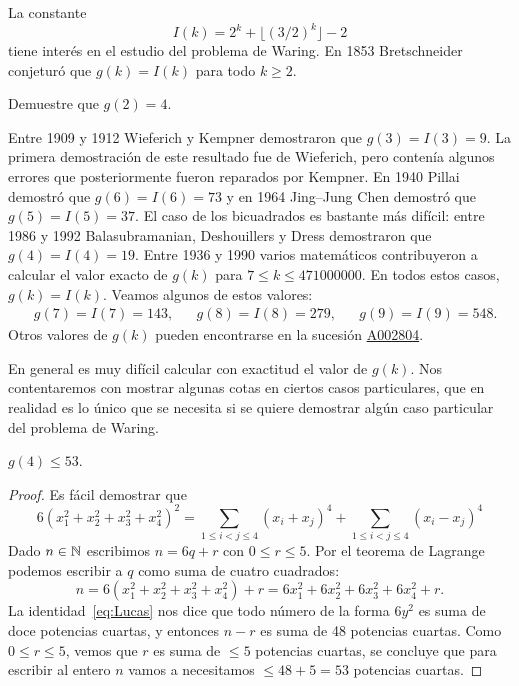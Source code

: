 La constante 
\[
	I(k)=2^k+\lfloor (3/2)^k\rfloor-2 
\]
tiene interés en el estudio del problema de Waring. En 1853 Bretschneider
conjeturó que $g(k)=I(k)$ para todo $k\geq2$.

\begin{exercise}
	Demuestre que $g(2)=4$. 
\end{exercise}

Entre 1909 y 1912 Wieferich y Kempner demostraron que $g(3)=I(3)=9$.  La
primera demostración de este resultado fue de Wieferich, pero contenía algunos
errores que posteriormente fueron reparados por Kempner.    
En 1940 Pillai
demostró que $g(6)=I(6)=73$ y en 1964 Jing--Jung Chen demostró que
$g(5)=I(5)=37$.  
El caso de los bicuadrados es bastante más difícil: entre 1986
y 1992 Balasubramanian, Deshouillers y Dress demostraron que $g(4)=I(4)=19$.
Entre 1936 y 1990 varios matemáticos contribuyeron a calcular el valor exacto
de $g(k)$ para $7\leq k\leq 471000000$. En todos estos casos, $g(k)=I(k)$.
Veamos algunos de estos valores:
\begin{align*}
	&g(7)=I(7)=143,
	&&g(8)=I(8)=279,
	&&g(9)=I(9)=548.
\end{align*}
Otros valores de $g(k)$ pueden encontrarse en la sucesión
\href{https://oeis.org/A002804}{A002804}.

En general es muy difícil calcular con exactitud el valor de $g(k)$. Nos
contentaremos con mostrar algunas cotas en ciertos casos particulares, que en
realidad es lo único que se necesita si se quiere demostrar algún caso
particular del problema de Waring.

\begin{theorem}[Liouville]
	$g(4)\leq 53$.
\end{theorem}

\begin{proof}
	Es fácil demostrar que
	\begin{equation}
		\label{eq:Lucas}
		6(x_1^2+x_2^2+x_3^2+x_4^2)^2=\sum_{1\leq i<j\leq 4}(x_i+x_j)^4+\sum_{1\leq i<j\leq 4}(x_i-x_j)^4
	\end{equation}
	Dado $n\in\mathbb{N}$ escribimos $n=6q+r$ con $0\leq r\leq 5$. Por el teorema de Lagrange podemos
	escribir a $q$ como suma de cuatro cuadrados:
	\[
		n=6(x_1^2+x_2^2+x_3^2+x_4^2)+r=6x_1^2+6x_2^2+6x_3^2+6x_4^2+r.
	\]
	La identidad~\eqref{eq:Lucas} nos dice que todo número de la forma $6y^2$
	es suma de doce potencias cuartas, y entonces $n-r$ es suma de 48 potencias
	cuartas. Como $0\leq r\leq 5$, vemos que $r$ es suma de $\leq 5$ potencias
	cuartas, se concluye que para escribir al entero $n$ vamos a necesitamos
	$\leq 48+5=53$ potencias cuartas.
\end{proof}

